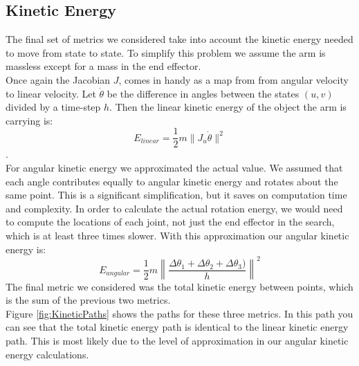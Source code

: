 \documentclass{article}
\begin{document}
\subsection{Kinetic Energy}
The final set of metrics we considered take into account the kinetic energy needed to move from state to state. To simplify this problem we assume the arm is massless except for a mass in the end effector. \\
Once again the Jacobian $J$, comes in handy as a map from from angular velocity to linear velocity. Let $\dot{\theta}$ be the difference in angles between the states $(u,v)$ divided by a time-step $h$. Then the linear kinetic energy of the object the arm is carrying is:
 \[E_{linear} = \frac{1}{2}m \|J_u\dot{\theta}\|^2\]. \\
For angular kinetic energy we approximated the actual value. We assumed that each angle contributes equally to angular kinetic energy and rotates about the same point. This is a significant simplification, but it saves on computation time and complexity. In order to calculate the actual rotation energy, we would need to compute the locations of each joint, not just the end effector in the search, which is at least three times slower. With this approximation our angular kinetic energy is: 
\[E_{angular} = \frac{1}{2}m \left\|\frac{\Delta\theta_1+\Delta\theta_2+\Delta\theta_3)}{h}\right\|^2\]
The final metric we considered was the total kinetic energy between points, which is the sum of the previous two metrics.\\
Figure \ref{fig:KineticPaths} shows the paths for these three metrics. In this path you can see that the total kinetic energy path is identical to the linear kinetic energy path. This is most likely due to the level of approximation in our angular kinetic energy calculations.\\
\end{document}
